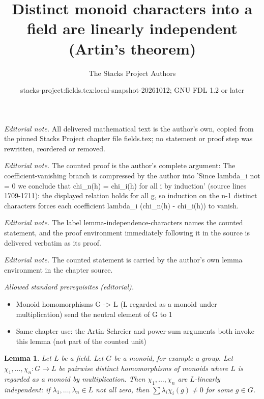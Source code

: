 \documentclass[10pt,a4paper]{amsart}
\title{Distinct monoid characters into a field are linearly independent (Artin's theorem)}
\author{The Stacks Project Authors}
\date{stacks-project:fields.tex:local-snapshot-20261012; GNU FDL 1.2 or later}
\theoremstyle{plain}
\newtheorem{lemma}[subsection]{Lemma}
\theoremstyle{definition}
\theoremstyle{remark}
\numberwithin{equation}{subsection}
\begin{document}
\maketitle
\noindent\textit{Editorial note.} All delivered mathematical text is the author's own, copied from the pinned Stacks Project chapter file fields.tex; no statement or proof step was rewritten, reordered or removed.\par\medskip
\noindent\textit{Editorial note.} The counted proof is the author's complete argument: The coefficient-vanishing branch is compressed by the author into 'Since lambda\_i not = 0 we conclude that chi\_n(h) = chi\_i(h) for all i by induction' (source lines 1709-1711): the displayed relation holds for all g, so induction on the n-1 distinct characters forces each coefficient lambda\_i (chi\_n(h) - chi\_i(h)) to vanish.\par\medskip
\noindent\textit{Editorial note.} The label lemma-independence-characters names the counted statement, and the proof environment immediately following it in the source is delivered verbatim as its proof.\par\medskip
\noindent\textit{Editorial note.} The counted statement is carried by the author's own lemma environment in the chapter source.\par\medskip
\noindent\textit{Allowed standard prerequisites (editorial).}\begin{itemize}
\item Monoid homomorphisms G -> L (L regarded as a monoid under multiplication) send the neutral element of G to 1
\item Same chapter use: the Artin-Schreier and power-sum arguments both invoke this lemma (not part of the counted unit)
\end{itemize}\medskip
\begin{lemma}
\label{lemma-independence-characters}
Let $L$ be a field. Let $G$ be a monoid, for example a group. Let
$\chi_1, \ldots, \chi_n : G \to L$ be pairwise distinct
homomorphisms of monoids where $L$ is regarded as a monoid
by multiplication. Then $\chi_1, \ldots, \chi_n$
are $L$-linearly independent: if $\lambda_1, \ldots, \lambda_n \in L$
not all zero, then $\sum \lambda_i\chi_i(g) \not = 0$
for some $g \in G$.
\end{lemma}
\end{document}
